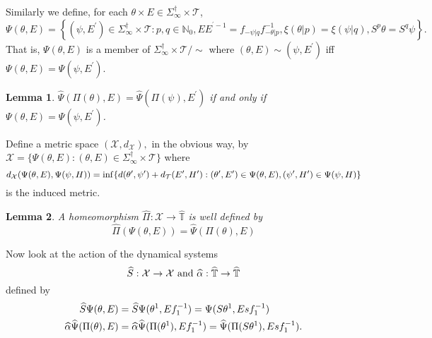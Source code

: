 \documentclass{amsproc}
\theoremstyle{plain}
\newtheorem{lemma}{Lemma}
\theoremstyle{definition}
\numberwithin{equation}{section}
\begin{document}
Similarly we define, for each $\theta\times E\in\Sigma_{\infty}^{\dag}\times%
\mathcal{T}$,%
\begin{equation*}
\Psi(\theta,E)=\left\{ \left( \psi,E^{\prime}\right) \in\Sigma_{\infty
}^{\dag}\times\mathcal{T}:p,q\in\mathbb{N}_{0},EE^{^{\prime}-1}=f_{-\psi
|q}f_{-\theta|p}^{-1},\xi(\theta|p)=\xi(\psi|q),S^{p}\theta=S^{q}\psi\right%
\} .
\end{equation*}
That is, $\Psi(\theta,E)$ is a member of $\Sigma_{\infty}^{\dag}\times%
\mathcal{T}/\sim$ where $(\theta,E)\sim\left( \psi,E^{\prime}\right) $ iff $%
\Psi(\theta,E)=\Psi\left( \psi,E^{\prime}\right) .$

\begin{lemma}
$\widehat{\Psi}(\Pi(\theta),E)=\widehat{\Psi}(\Pi(\psi),E^{\prime})$ if and
only if $\Psi(\theta,E)=\Psi(\psi,E^{\prime})$.
\end{lemma}

Define a metric space $(\mathcal{X},d_{\mathcal{X}}),$ in the obvious way,
by $\mathcal{X=\{}\Psi(\theta,E):(\theta,E)\in\Sigma_{\infty}^{\dag}\times%
\mathcal{T\}}$ where 
\begin{equation*}
d_{\mathcal{X}}(\Psi(\theta,E),\Psi(\psi,H))=\inf\{d(\theta^{\prime},\psi^{%
\prime})+d_{\mathcal{T}}(E^{\prime},H^{\prime}):(\theta^{\prime
},E^{\prime})\in\Psi(\theta,E),(\psi^{\prime},H^{\prime})\in\Psi(\psi,H)\}
\end{equation*}
is the induced metric.

\begin{lemma}
A homeomorphism $\widehat{\Pi}:\mathcal{X\rightarrow}\widehat{\mathbb{T}}$
is well defined by%
\begin{equation*}
\widehat{\Pi}(\Psi(\theta,E))=\widehat{\Psi}(\Pi\left( \theta\right) ,E)
\end{equation*}
\end{lemma}

Now look at the action of the dynamical systems 
\begin{equation*}
\widehat{S}:\mathcal{X\rightarrow X}\text{ and }\widehat{\alpha}:\widehat{%
\mathbb{T}}\rightarrow\widehat{\mathbb{T}}
\end{equation*}
defined by%
\begin{align*}
\widehat{S}\Psi(\theta,E) & =\widehat{S}\Psi(\theta^{1},Ef_{1}^{-1})=\Psi(S%
\theta^{1},Esf_{1}^{-1}) \\
\widehat{\alpha}\widehat{\Psi}(\Pi(\theta),E) & =\widehat{\alpha }\widehat{%
\Psi}(\Pi(\theta^{1}),Ef_{1}^{-1})=\widehat{\Psi}(\Pi(S\theta
^{1}),Esf_{1}^{-1}).
\end{align*}
\end{document}
